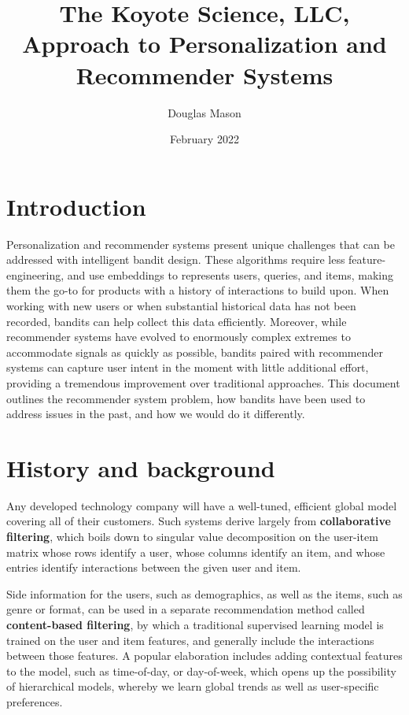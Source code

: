 \documentclass{article}
\title{The Koyote Science, LLC, Approach to Personalization and Recommender Systems}
\author[1]{Douglas Mason}
\affil[1]{\href{http://www.koyotescience.com}{Koyote Science, LLC}}
\date{February 2022}
\begin{document}
\maketitle

\tableofcontents

\pagestyle{fancy}

\section{Introduction}

Personalization and recommender systems present unique challenges that can be addressed with intelligent bandit design. These algorithms require less feature-engineering, and use embeddings to represents users, queries, and items, making them the go-to for products with a history of interactions to build upon. When working with new users or when substantial historical data has not been recorded, bandits can help collect this data efficiently. Moreover, while recommender systems have evolved to enormously complex extremes to accommodate signals as quickly as possible, bandits paired with recommender systems can capture user intent in the moment with little additional effort, providing a tremendous improvement over traditional approaches. This document outlines the recommender system problem, how bandits have been used to address issues in the past, and how we would do it differently.

\section{History and background}

Any developed technology company will have a well-tuned, efficient global model covering all of their customers. Such systems derive largely from \textbf{collaborative filtering}\cite{CF_survey1, CF_survey2, CF_survey3}, which boils down to singular value decomposition on the user-item matrix whose rows identify a user, whose columns identify an item, and whose entries identify interactions between the given user and item.

Side information for the users, such as demographics, as well as the items, such as genre or format, can be used in a separate recommendation method called \textbf{content-based filtering}, by which a traditional supervised learning model is trained on the user and item features, and generally include the interactions between those features. A popular elaboration includes adding contextual features to the model, such as time-of-day, or day-of-week, which opens up the possibility of hierarchical models, whereby we learn global trends as well as user-specific preferences. 
\end{document}

